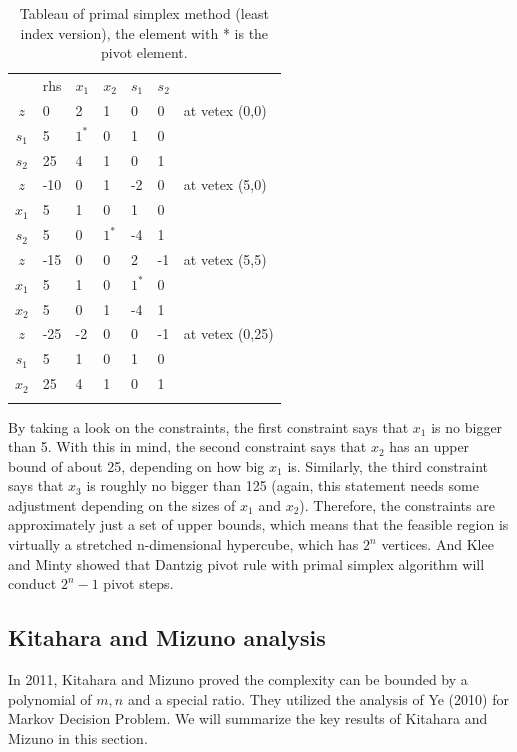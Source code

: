 \documentclass[11pt]{article}
\begin{document}
\begin{table}[H]
\caption{Tableau of primal simplex method (least index version), the element with * is the pivot element. }
\label{Table: tableau}
\centering
\begin{tabular}{c|llllll}
   & rhs & $x_1$ & $x_2$ & $s_1$ & $s_2$ &                 \\ \cline{1-6}
$z$  & 0   & 2  & 1  & 0  & 0  & at vetex (0,0)  \\
$s_1$ & 5   & $1^*$  & 0  & 1  & 0  &                 \\
$s_2$ & 25  & 4  & 1  & 0  & 1  &                 \\ \hhline{======}
$z$  & -10 & 0  & 1  & -2 & 0  & at vetex (5,0)  \\
$x_1$ & 5   & 1  & 0  & 1  & 0  &                 \\
$s_2$ & 5   & 0  & $1^*$  & -4 & 1  &                 \\ \hhline{======}
$z$  & -15 & 0  & 0  & 2  & -1 & at vetex (5,5)  \\
$x_1$ & 5   & 1  & 0  & $1^*$  & 0  &                 \\
$x_2$ & 5   & 0  & 1  & -4 & 1  &                 \\ \hhline{======}
$z$  & -25 & -2 & 0  & 0  & -1 & at vetex (0,25) \\
$s_1$ & 5   & 1  & 0  & 1  & 0  &                 \\
$x_2$ & 25  & 4  & 1  & 0  & 1  &                 \\ \hhline{======}
\end{tabular}
\end{table}
By taking a look on the constraints, the first constraint says that $x_1$ is no bigger than 5. With this in mind, the second constraint says that $x_2$ has an upper bound of about 25, depending on how big $x_1$ is. Similarly, the third constraint says that $x_3$ is roughly no bigger than 125 (again, this statement needs some adjustment depending on the sizes of $x_1$ and $x_2$). Therefore, the constraints are approximately just a set of upper bounds, which means that the feasible region is virtually a stretched n-dimensional hypercube, which has $2^n$ vertices. And Klee and Minty \cite{klee1972good} showed that Dantzig pivot rule with primal simplex algorithm will conduct $2^n -1$ pivot steps.

\subsection{Kitahara and Mizuno analysis} \label{seckita}
In 2011, Kitahara and Mizuno \cite{kitahara2013bound} proved the complexity can be bounded by a polynomial of $m, n$ and a special ratio. They utilized the analysis of Ye (2010) \cite{ye2010simplex} for Markov Decision Problem. We will summarize the key results of Kitahara and Mizuno \cite{kitahara2013bound} in this section. 
\end{document}
